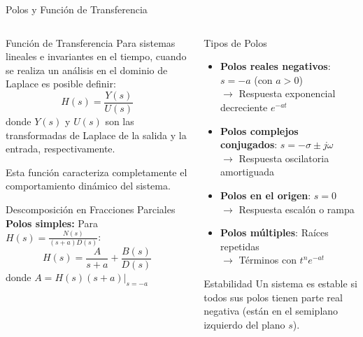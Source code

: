 \documentclass[
    10pt,
    aspectratio=169,
    xcolor={dvipsnames},
    spanish,
    ]{beamer}
\begin{document}
\begin{frame}{Polos y Función de Transferencia}
\begin{columns}
  \begin{column}{0.48\textwidth}
    \begin{block}{Función de Transferencia}
      \footnotesize
      Para sistemas lineales e invariantes en el tiempo, cuando se realiza un análisis en el dominio de Laplace es posible definir:
      $$H(s) = \frac{Y(s)}{U(s)}$$
      donde $Y(s)$ y $U(s)$ son las transformadas de Laplace de la salida y la entrada, respectivamente.
      
      Esta función caracteriza completamente el comportamiento dinámico del sistema.
    \end{block}
    
    \begin{block}{Descomposición en Fracciones Parciales}
      \footnotesize
      \textbf{Polos simples:} Para $H(s) = \frac{N(s)}{(s+a)D(s)}$:
      $$H(s) = \frac{A}{s+a} + \frac{B(s)}{D(s)}$$
      donde $A = H(s)(s+a)|_{s=-a}$
    \end{block}
  \end{column}
  
  \begin{column}{0.48\textwidth}
    \begin{block}{Tipos de Polos}
      \footnotesize
      \begin{itemize}
        \item \textbf{Polos reales negativos}: $s = -a$ (con $a > 0$)
        \\$\rightarrow$ Respuesta exponencial decreciente $e^{-at}$
        \item \textbf{Polos complejos conjugados}: $s = -\sigma \pm j\omega$
        \\$\rightarrow$ Respuesta oscilatoria amortiguada
        \item \textbf{Polos en el origen}: $s = 0$
        \\$\rightarrow$ Respuesta escalón o rampa
        \item \textbf{Polos múltiples}: Raíces repetidas
        \\$\rightarrow$ Términos con $t^n e^{-at}$
      \end{itemize}
    \end{block}
    
    \begin{alertblock}{Estabilidad}
      \footnotesize
      Un sistema es estable si todos sus polos tienen parte real negativa (están en el semiplano izquierdo del plano $s$).
    \end{alertblock}
  \end{column}
\end{columns}
\end{frame}
\end{document}

